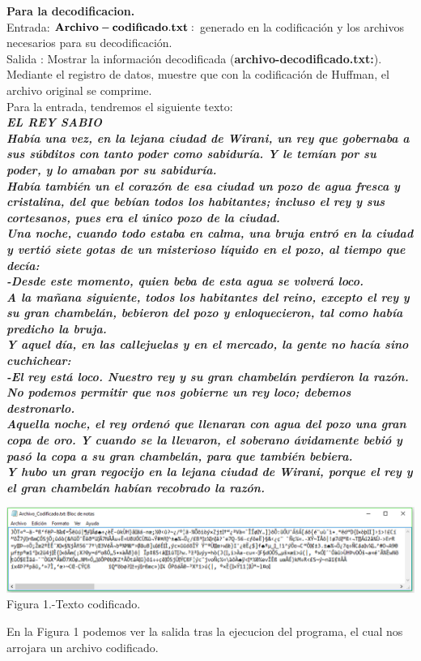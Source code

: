 \documentclass[spanish]{article}
\begin{document}
	{\large{ {{\bf Para la decodificacion.} }}}\\
			{\hspace{0.2cm} Entrada: ${\bf Archivo-codificado.txt:}$ generado en la codificación y los archivos necesarios para su decodificación.\\}
		 	Salida : Mostrar la información decodificada ({\bf archivo-decodificado.txt:}).\\
		 Mediante el registro de datos, muestre que con la codificación de Huffman, el archivo original se comprime.\\
	\bigskip	
	Para la entrada, tendremos el siguiente texto:\\
\textbf{\textit{
	EL REY SABIO\\
Había una vez, en la lejana ciudad de Wirani, un rey que gobernaba a sus súbditos con tanto poder como
sabiduría. Y le temían por su poder, y lo amaban por su sabiduría.\\
Había también un el corazón de esa ciudad un pozo de agua fresca y cristalina, del que bebían todos los
habitantes; incluso el rey y sus cortesanos, pues era el único pozo de la ciudad.\\
Una noche, cuando todo estaba en calma, una bruja entró en la ciudad y vertió siete gotas de un
misterioso líquido en el pozo, al tiempo que decía:\\
-Desde este momento, quien beba de esta agua se volverá loco.\\
A la mañana siguiente, todos los habitantes del reino, excepto el rey y su gran chambelán, bebieron del
pozo y enloquecieron, tal como había predicho la bruja.\\
Y aquel día, en las callejuelas y en el mercado, la gente no hacía sino cuchichear:\\
-El rey está loco. Nuestro rey y su gran chambelán perdieron la razón. No podemos permitir que nos
gobierne un rey loco; debemos destronarlo.\\
Aquella noche, el rey ordenó que llenaran con agua del pozo una gran copa de oro. Y cuando se la
llevaron, el soberano ávidamente bebió y pasó la copa a su gran chambelán, para que también bebiera.\\
Y hubo un gran regocijo en la lejana ciudad de Wirani, porque el rey y el gran chambelán habían
recobrado la razón.}}
\newpage
	\begin{center}
		\includegraphics[width=1\textwidth, right]{./imagenes/prog1.png}\\
		Figura 1.-Texto codificado.
	\end{center}
En la Figura 1 podemos ver la salida tras la ejecucion del programa, el cual nos arrojara un archivo codificado.
\end{document}
